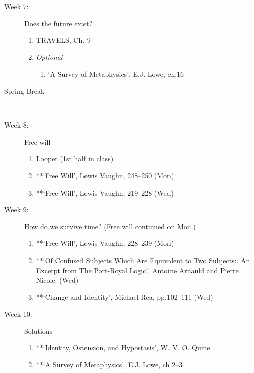 \documentclass[article,oneside]{memoir}
\begin{document}
\begin{description}
\item[Week 7:] Does the future exist? 
\begin{enumerate}
\item TRAVELS, Ch. 9
\item \emph{Optional}
\begin{enumerate}
\item `A Survey of Metaphysics', E.J. Lowe, ch.16
\end{enumerate}
\end{enumerate}
\item[Spring Break]\


\item[Week 8:] Free will
\begin{enumerate}
\item Looper (1st half in class)
\item **`Free Will', Lewis Vaughn, 248--250 (Mon)
\item **`Free Will', Lewis Vaughn, 219--228 (Wed)
\end{enumerate}


\item[Week 9:] How do we survive time? (Free will continued on Mon.)
\begin{enumerate}
\item **`Free Will', Lewis Vaughn, 228--239 (Mon)
\item **`Of Confused Subjects Which Are Equivalent to Two Subjects:. An Excerpt from The Port-Royal Logic', Antoine Arnauld and Pierre Nicole. (Wed)
\item **`Change and Identity', Michael Rea, pp.102--111  (Wed)
\end{enumerate}

\item[Week 10:] Solutions 
\begin{enumerate}
 \item **`Identity, Ostension, and Hypostasis', W. V. O. Quine.
\item **`A Survey of Metaphysics', E.J. Lowe, ch.2--3


\end{enumerate}
\end{description}
\end{document}
